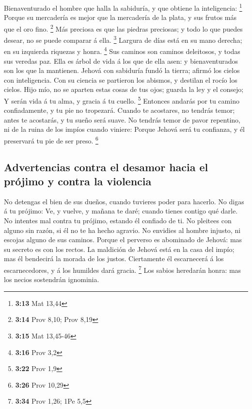  Bienaventurado el hombre que halla la sabiduría, y que
obtiene la inteligencia: \footnote{\textbf{3:13} Mat 13,44}
 Porque su mercadería es mejor que la mercadería de la
plata, y sus frutos más que el oro fino. \footnote{\textbf{3:14} Prov
  8,10; Prov 8,19}  Más preciosa es que las piedras
preciosas; y todo lo que puedes desear, no se puede comparar á ella.
\footnote{\textbf{3:15} Mat 13,45-46}  Largura de días
está en su mano derecha; en su izquierda riquezas y honra. \footnote{\textbf{3:16}
  Prov 3,2}  Sus caminos son caminos deleitosos, y todas
sus veredas paz.  Ella es árbol de vida á los que de ella
asen: y bienaventurados son los que la mantienen.  Jehová
con sabiduría fundó la tierra; afirmó los cielos con inteligencia.
 Con su ciencia se partieron los abismos, y destilan el
rocío los cielos.  Hijo mío, no se aparten estas cosas de
tus ojos; guarda la ley y el consejo;  Y serán vida á tu
alma, y gracia á tu cuello. \footnote{\textbf{3:22} Prov 1,9}
 Entonces andarás por tu camino confiadamente, y tu pie
no tropezará.  Cuando te acostares, no tendrás temor;
antes te acostarás, y tu sueño será suave.  No tendrás
temor de pavor repentino, ni de la ruina de los impíos cuando viniere:
 Porque Jehová será tu confianza, y él preservará tu pie
de ser preso. \footnote{\textbf{3:26} Prov 10,29}

\hypertarget{advertencias-contra-el-desamor-hacia-el-pruxf3jimo-y-contra-la-violencia}{%
\subsection{Advertencias contra el desamor hacia el prójimo y contra la
violencia}\label{advertencias-contra-el-desamor-hacia-el-pruxf3jimo-y-contra-la-violencia}}

 No detengas el bien de sus dueños, cuando tuvieres poder
para hacerlo.  No digas á tu prójimo: Ve, y vuelve, y
mañana te daré; cuando tienes contigo qué darle.  No
intentes mal contra tu prójimo, estando él confiado de ti.
 No pleitees con alguno sin razón, si él no te ha hecho
agravio.  No envidies al hombre injusto, ni escojas
alguno de sus caminos.  Porque el perverso es abominado
de Jehová: mas su secreto es con los rectos.  La
maldición de Jehová está en la casa del impío; mas él bendecirá la
morada de los justos.  Ciertamente él escarnecerá á los
escarnecedores, y á los humildes dará gracia. \footnote{\textbf{3:34}
  Prov 1,26; 1Pe 5,5}  Los sabios heredarán honra: mas
los necios sostendrán ignominia.

